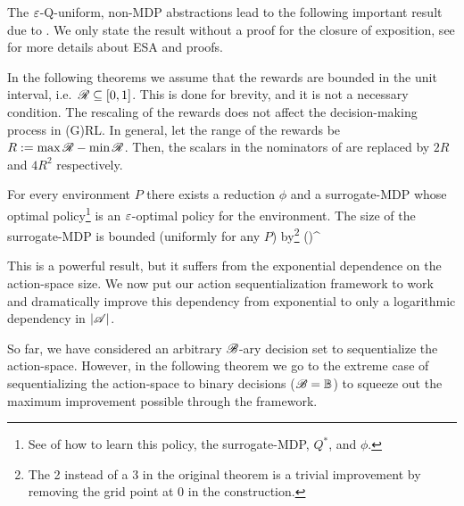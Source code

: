 \documentclass{article} %
\let\thmOrg\theorem
\let\endthmOrg\endtheorem
\renewenvironment{theorem}{\begin{tcolorbox}\thmOrg}{\endthmOrg\end{tcolorbox}}
\begin{document}
The $\varepsilon$-Q-uniform, non-MDP abstractions lead to the following important result due to \citet{Hutter2016}. We only state the result without a proof for the closure of exposition, see \citet{Hutter2016} for more details about ESA and proofs.

In the following theorems we assume that the rewards are bounded in the unit interval, i.e.\ $\mathscr{R} \subseteq [0,1]$. This is done for brevity, and it is not a necessary condition. The rescaling of the rewards does not affect the decision-making process in (G)RL. In general, let the range of the rewards be $R := \max \mathscr{R} - \min \mathscr{R}$. Then, the scalars in the nominators of  are replaced by $2R$ and $4R^2$ respectively.

\begin{theorem}[ESA {\cite[Theorem 11]{Hutter2016}}] \label{thm:esa}
    For every environment $P$ there exists a reduction $\phi$ and a surrogate-MDP whose optimal policy\footnote{See \citet{Hutter2016} of how to learn this policy, the surrogate-MDP, $Q^*$, and $\phi$.} is an $\varepsilon$-optimal policy for the environment. The size of the surrogate-MDP is bounded (uniformly for any $P$) by\footnote{The 2 instead of a 3 in the original theorem is a trivial improvement by removing the grid point at 0 in the construction.}
    \beqn
    \abs{\S} \leq \left(\right)^{\abs{\A}}
    \eeqn
\end{theorem}

This is a powerful result, but it suffers from the exponential dependence on the action-space size. We now put our action sequentialization framework to work and dramatically improve this dependency from exponential to only a logarithmic dependency in ${\left\lvert\mathscr{A}\right\rvert}$.

So far, we have considered an arbitrary $\mathscr{B}$-ary decision set to sequentialize the action-space. However, in the following theorem we go to the extreme case of sequentializing the action-space to binary decisions ($\mathscr{B} = \mathbb{B}$) to squeeze out the maximum improvement possible through the framework.
\end{document}
